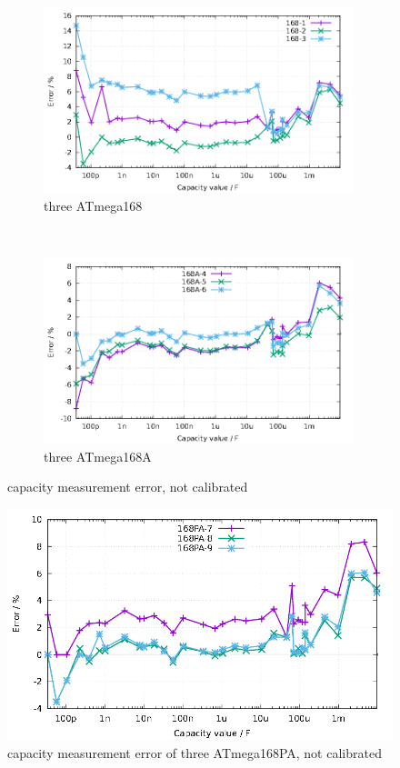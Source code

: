 \begin{figure}[H]
  \begin{subfigure}[b]{9cm}
    \centering
    \includegraphics[width=9cm]{../GNU/Mega168all.pdf}
    \caption{three ATmega168}
    \label{fig:mega168all}
  \end{subfigure}
  ~
  \begin{subfigure}[b]{9cm}
    \centering
    \includegraphics[width=9cm]{../GNU/Mega168Aall.pdf}
    \caption{three ATmega168A}
    \label{fig:mega168Aall}
  \end{subfigure}
\caption{capacity measurement error, not calibrated}
\end{figure}

\begin{figure}[H]
\centering
\includegraphics[width=16cm]{../GNU/Mega168PAall.pdf}
\caption{capacity measurement error of three ATmega168PA, not calibrated}
\label{fig:mega168PAall}
\end{figure}

